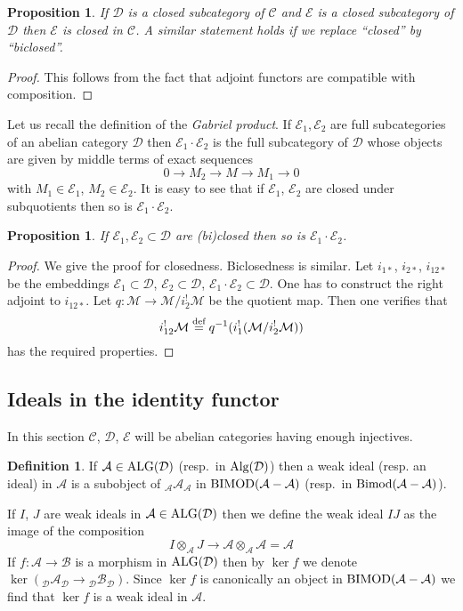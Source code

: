 \documentclass{amsproc}
\def\Ascr{{\mathcal A}}
\def\Bscr{{\mathcal B}}
\def\Cscr{{\mathcal C}}
\def\Dscr{{\mathcal D}}
\def\Escr{{\mathcal E}}
\def\Mscr{{\mathcal M}}
\def\Bimod{\mathop{\text{Bimod}}}
\def\BIMOD{\mathop{\text{BIMOD}}}
\def\Alg{\mathop{\text{Alg}}}
\def\ALG{\mathop{\text{ALG}}}
\def\ker{\operatorname {ker}}
\def\r{\rightarrow}
\let\oldtext\text
\def\text#1{\oldtext{\upshape #1}}
\newtheorem{propositions}[lemmas]{Proposition}
\theoremstyle{definition}
\newtheorem{definitions}[lemmas]{Definition}
\theoremstyle{remark}
\numberwithin{equation}{section}
\numberwithin{table}{section}
\numberwithin{figure}{section}
\begin{document}
\begin{propositions} 
\label{ref:3.4.4a}
If $\Dscr$ is a closed subcategory of $\Cscr$ and $\Escr$
is a closed subcategory of $\Dscr$ then $\Escr$ is closed in $\Cscr$.
A similar statement holds if we replace ``closed'' by ``biclosed''.
\end{propositions}
\begin{proof} This follows from the fact that adjoint functors are compatible
with composition.
\end{proof}
Let us recall the definition of the \emph{Gabriel product}. If
$\Escr_1,\Escr_2$ are full subcategories of an abelian category $\Dscr$ then
$\Escr_1\cdot\Escr_2$ is the full subcategory of $\Dscr$ whose objects are
given by middle terms of exact sequences
\[
0\r M_2\r M\r M_1
\r
0
\]
with $M_1\in \Escr_1$, $M_2\in \Escr_2$. It is easy to see that if $\Escr_1$,
$\Escr_2$ are closed under subquotients then so is $\Escr_1\cdot \Escr_2$.
\begin{propositions} 
\label{ref:3.4.5a}
\cite{rosenberg} If $\Escr_1,\Escr_2\subset \Dscr$ are
(bi)closed then so is $\Escr_1\cdot\Escr_2$.
\end{propositions}
\begin{proof}
  We give the proof for closedness. Biclosedness is similar.  Let
  $i_{1\ast}$, $i_{2\ast}$, $i_{12\ast}$ be the embeddings
  $\Escr_1\subset \Dscr$, $\Escr_2\subset \Dscr$,
  $\Escr_1\cdot\Escr_2\subset \Dscr$. One has to construct the right
  adjoint to $i_{12\ast}$. Let $q:\Mscr\r \Mscr/i^!_2\Mscr$ be the
  quotient map. Then one verifies that
\[
i^!_{12}\Mscr \overset{\text{def}}{=} q^{-1} (i^!_1(\Mscr/i^!_2\Mscr))
\]
has the required properties.
\end{proof}
\subsection{Ideals in the identity functor}
\label{ref:3.5b}
In this section $\Cscr$, $\Dscr$, $\Escr$ will be abelian categories  having
enough injectives.
\begin{definitions} If $\Ascr\in \ALG(\Dscr)$ (resp.\ in
  $\Alg(\Dscr)$) then a weak ideal (resp. an
  ideal) in $\Ascr$ is a subobject of ${}_\Ascr \Ascr_\Ascr$ in
  $\BIMOD(\Ascr-\Ascr)$ (resp.\ in $\Bimod(\Ascr-\Ascr)$).
\end{definitions}
If $I$, $J$ are weak ideals in $\Ascr\in \ALG(\Dscr)$ then we define the weak
ideal
$IJ$ as the image of the composition
\[
I\otimes_\Ascr J\r \Ascr\otimes_\Ascr\Ascr=\Ascr
\]
If $f:\Ascr\r\Bscr$ is a morphism in $\ALG(\Dscr)$ then by $\ker f$ we denote
$\ker ({}_\Dscr\Ascr_\Dscr\r {}_\Dscr\Bscr_\Dscr)$. Since $\ker f$ is
canonically an object in $\BIMOD(\Ascr-\Ascr)$ we find that $\ker f$ is a weak
ideal in $\Ascr$.
\end{document}
